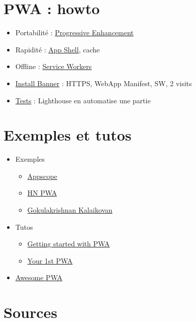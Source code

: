 \hypertarget{pwa-howto}{%
\section{PWA : howto}\label{pwa-howto}}

\begin{itemize}
\tightlist
\item
  Portabilité :
  \href{https://www.smashingmagazine.com/2009/04/progressive-enhancement-what-it-is-and-how-to-use-it/}{Progressive
  Enhancement}
\item
  Rapidité :
  \href{https://developers.google.com/web/updates/2015/11/app-shell}{App
  Shell}, cache
\item
  Offline :
  \href{https://jakearchibald.com/2014/service-worker-first-draft/}{Service
  Workers}
\item
  \href{https://developers.google.com/web/fundamentals/app-install-banners/}{Install
  Banner} : HTTPS, WebApp Manifest, SW, 2 visits
\item
  \href{https://developers.google.com/web/progressive-web-apps/checklist}{Tests}
  : Lighthouse en automatise une partie
\end{itemize}

\hypertarget{exemples-et-tutos}{%
\section{Exemples et tutos}\label{exemples-et-tutos}}

\begin{itemize}
\tightlist
\item
  Exemples

  \begin{itemize}
  \tightlist
  \item
    \href{https://appsco.pe/}{Appscope}
  \item
    \href{https://hnpwa.com/}{HN PWA}
  \item
    \href{https://github.com/gokulkrishh}{Gokulakrishnan Kalaikovan}
  \end{itemize}
\item
  Tutos

  \begin{itemize}
  \tightlist
  \item
    \href{https://addyosmani.com/blog/getting-started-with-progressive-web-apps/}{Getting
    started with PWA}
  \item
    \href{https://developers.google.com/web/fundamentals/codelabs/your-first-pwapp/}{Your
    1st PWA}
  \end{itemize}
\item
  \href{https://github.com/hemanth/awesome-pwa}{Awesome PWA}
\end{itemize}

\hypertarget{sources}{%
\section{Sources}\label{sources}}
